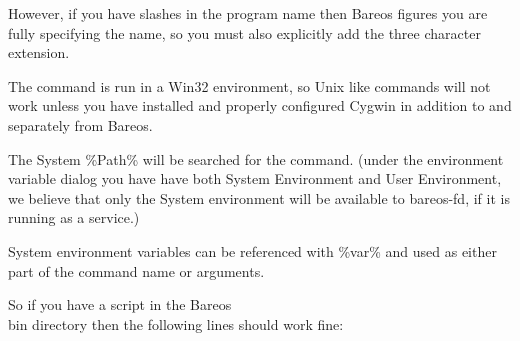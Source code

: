 {However, if you have slashes in the program name then Bareos figures you
are fully specifying the name, so you must also explicitly add the three
character extension.

The command is run in a Win32 environment, so Unix like commands will not
work unless you have installed and properly configured Cygwin in addition
to and separately from Bareos.

The System \%Path\% will be searched for the command.  (under the
environment variable dialog you have have both System Environment and
User Environment, we believe that only the System environment will be
available to bareos-fd, if it is running as a service.)

System environment variables can be referenced with \%var\% and
used as either part of the command name or arguments.

So if you have a script in the Bareos\\bin directory then the following lines
should work fine:




}
